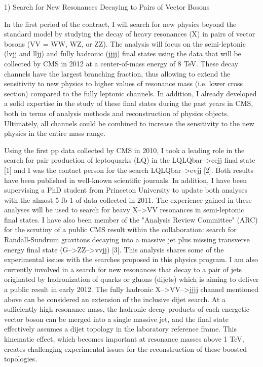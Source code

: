\documentclass[10pt, a4paper]{article}
\begin{document}
1) Search for New Resonances Decaying to Pairs of Vector Bosons

In the first period of the contract, I will search for new physics beyond the standard model by studying the decay of heavy resonances (X) in pairs of vector bosons (VV = WW, WZ, or ZZ). The analysis will focus on the semi-leptonic (lvjj and lljj) and fully hadronic (jjjj) final states using the data that will be collected by CMS in 2012 at a center-of-mass energy of 8 TeV.  These decay channels have the largest branching fraction, thus allowing to extend the sensitivity to new physics to higher values of resonance mass (i.e. lower cross section) compared to the fully leptonic channels. In addition, I already developed a solid expertise in the study of these final states during the past years in CMS, both in terms of analysis methods and reconstruction of physics objects. Ultimately, all channels could be combined to increase the sensitivity to the new physics in the entire mass range.

Using the first pp data collected by CMS in 2010, I took a leading role in the search for pair production of leptoquarks (LQ) in the LQLQbar-->eejj final state [1] and I was the contact person for the search LQLQbar-->evjj [2]. Both results have been published in well-known scientific journals. In addition, I have been supervising a PhD student from Princeton University to update both analyses with the almost 5 fb-1 of data collected in 2011. The experience gained in these analyses will be used to search for heavy X-->VV resonances in semi-leptonic final states. I have also been member of the "Analysis Review Committee" (ARC) for the scrutiny of a public CMS result within the collaboration: search for Randall-Sundrum gravitons decaying into a massive jet plus missing transverse energy final state (G-->ZZ-->vvjj) [3]. This analysis shares some of the experimental issues with the searches proposed in this physics program.  I am also currently involved in a search for new resonances that decay to a pair  of jets originated by hadronization of quarks or gluons (dijets) which is aiming to deliver a public result in early 2012. The fully hadronic X-->VV-->jjjj channel mentioned above can be considered an extension of the inclusive dijet search. At a sufficiently high resonance mass, the hadronic decay products of each energetic vector boson can be merged into a single massive jet, and the final state effectively assumes a dijet topology in the laboratory reference frame. This kinematic effect, which becomes important at resonance masses above 1 TeV, creates challenging experimental issues for the reconstruction of these boosted topologies.
\end{document}
